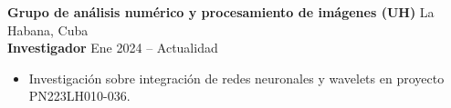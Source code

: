 \documentclass[11pt]{article}
\begin{document}
	\vspace{6pt}
	\textbf{Grupo de análisis numérico y procesamiento de imágenes (UH)} \hfill La Habana, Cuba \\
	\textbf{Investigador} \hfill Ene 2024 – Actualidad
	\begin{itemize}[left=10pt,itemsep=3pt]
		\item Investigación sobre integración de redes neuronales y wavelets en proyecto PN223LH010-036.
	\end{itemize}
	
\end{document}
